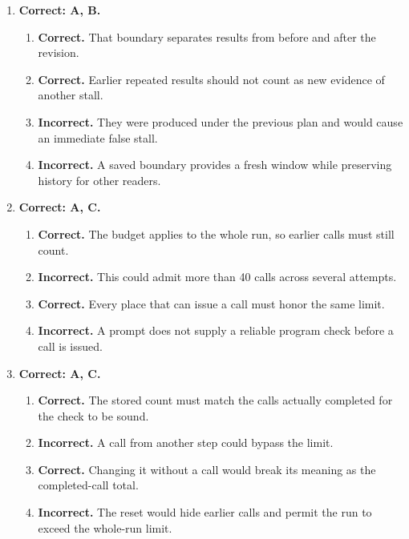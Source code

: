 \begin{enumerate}[start=11,itemsep=0.7\baselineskip]
\item[{\hyperref[exercise:17]{17.}}] \begin{minipage}[t]{\linewidth}
\textbf{Correct: A, B.}
\begin{enumerate}[label=\textnormal{(\Alph*)},leftmargin=*,itemsep=0pt]
\item \textbf{Correct.} That boundary separates results from before and after the revision.
\item \textbf{Correct.} Earlier repeated results should not count as new evidence of another stall.
\item \textbf{Incorrect.} They were produced under the previous plan and would cause an immediate false stall.
\item \textbf{Incorrect.} A saved boundary provides a fresh window while preserving history for other readers.
\end{enumerate}
\end{minipage}

\item[{\hyperref[exercise:18]{18.}}] \begin{minipage}[t]{\linewidth}
\textbf{Correct: A, C.}
\begin{enumerate}[label=\textnormal{(\Alph*)},leftmargin=*,itemsep=0pt]
\item \textbf{Correct.} The budget applies to the whole run, so earlier calls must still count.
\item \textbf{Incorrect.} This could admit more than 40 calls across several attempts.
\item \textbf{Correct.} Every place that can issue a call must honor the same limit.
\item \textbf{Incorrect.} A prompt does not supply a reliable program check before a call is issued.
\end{enumerate}
\end{minipage}

\item[{\hyperref[exercise:19]{19.}}] \begin{minipage}[t]{\linewidth}
\textbf{Correct: A, C.}
\begin{enumerate}[label=\textnormal{(\Alph*)},leftmargin=*,itemsep=0pt]
\item \textbf{Correct.} The stored count must match the calls actually completed for the check to be sound.
\item \textbf{Incorrect.} A call from another step could bypass the limit.
\item \textbf{Correct.} Changing it without a call would break its meaning as the completed-call total.
\item \textbf{Incorrect.} The reset would hide earlier calls and permit the run to exceed the whole-run limit.
\end{enumerate}
\end{minipage}


\end{enumerate}
